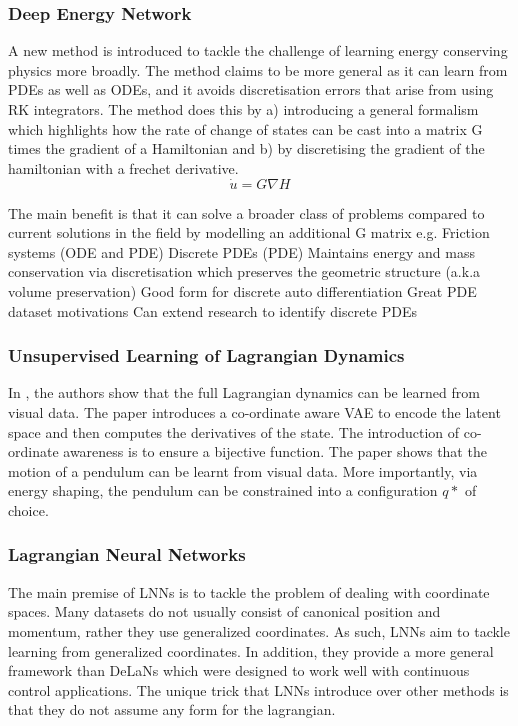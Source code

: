 \documentclass{article}
\begin{document}
\subsubsection{Deep Energy Network}

A new method is introduced to tackle the challenge of learning energy conserving physics more broadly. The method claims to be more general as it can learn from PDEs as well as ODEs, and it avoids discretisation errors that arise from using RK integrators. The method does this by a) introducing a general formalism which highlights how the rate of change of states can be cast into a matrix G times the gradient of a Hamiltonian and b) by discretising the gradient of the hamiltonian with a frechet derivative. 
\begin{equation}
 \dot{u} = G\nabla H
\end{equation}
 
The main benefit is that it can solve a broader class of problems compared to current solutions in the field by modelling an additional G matrix e.g.
Friction systems (ODE and PDE)
Discrete PDEs (PDE)
Maintains energy and mass conservation via discretisation which preserves the geometric structure (a.k.a volume preservation)
Good form for discrete auto differentiation
Great PDE dataset motivations
Can extend research to identify discrete PDEs

\subsubsection{Unsupervised Learning of Lagrangian Dynamics}

In \cite{zhong_unsupervised_2020}, the authors show that the full Lagrangian dynamics can be learned from visual data. The paper introduces a co-ordinate aware VAE to encode the latent space and then computes the derivatives of the state. The introduction of co-ordinate awareness is to ensure a bijective function. The paper shows that the motion of a pendulum can be learnt from visual data. More importantly, via energy shaping, the pendulum can be constrained into a configuration $q*$ of choice.

\subsubsection{Lagrangian Neural Networks}

The main premise of LNNs \cite{cranmer_lagrangian_2020} is to tackle the problem of dealing with coordinate spaces. Many datasets do not usually consist of  canonical position and momentum, rather they use generalized coordinates. As such, LNNs aim to tackle learning from generalized coordinates. In addition, they provide a more general framework than DeLaNs which were designed to work well with continuous control applications. The unique trick that LNNs introduce over other methods is that they do not assume any form for the lagrangian. 
\end{document}
